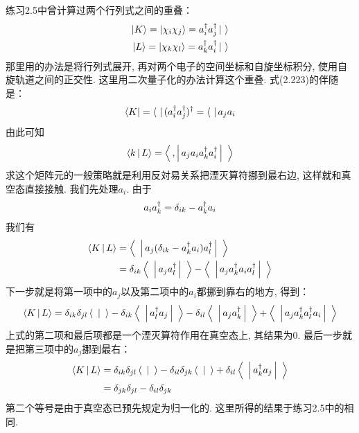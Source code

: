 练习2.5中曾计算过两个行列式之间的重叠：
\begin{align}
\Ket{K} = \Ket{\chi_i\chi_j} = a^\dagger_ia^\dagger_j\Ket{\,\,}\\
\Ket{L} = \Ket{\chi_k\chi_l} = a^\dagger_ka^\dagger_i\Ket{\,\,}
\end{align}
那里用的办法是将行列式展开, 再对两个电子的空间坐标和自旋坐标积分, 使用自旋轨道之间的正交性. 这里用二次量子化的办法计算这个重叠. 式(2.223)的伴随是：
\begin{align}
\Bra{K} = \Bra{\,\,}(a^\dagger_ia^\dagger_j)^\dagger = \Bra{\,\,}a_ja_i
\end{align}
由此可知
\begin{align}
\Braket{k|L} = \Braket{\,,|a_ja_ia^\dagger_ka^\dagger_i|\,\,}
\end{align}
求这个矩阵元的一般策略就是利用反対易关系把湮灭算符挪到最右边, 这样就和真空态直接接触. 我们先处理$a_i$. 由于
\begin{align}
a_ia^\dagger_k = \delta_{ik} - a^\dagger_ka_i
\end{align}
我们有
\begin{align}
\Braket{K|L} & = \Braket{\,\,|a_j(\delta_{ik}-a^\dagger_ka_i)a^\dagger_l|\,\,}\\
             & = \delta_{ik}\Braket{\,\,|a_ja^\dagger_l|\,\,} - \Braket{\,\,|a_ja^\dagger_ka_ia^\dagger_l|\,\,}
\end{align}
下一步就是将第一项中的$a_j$以及第二项中的$a_i$都挪到靠右的地方, 得到：
\begin{align}
\Braket{K|L} = \delta_{ik}\delta_{jl} \Braket{\,\,|\,\,} - \delta_{ik}\Braket{\,\,|a^\dagger_la_j|\,\,} - \delta_{il}\Braket{\,\,|a_ja^\dagger_k|\,\,} + \Braket{\,\,|a_ja^\dagger_ka^\dagger_la_i|\,\,}
\end{align}
上式的第二项和最后项都是一个湮灭算符作用在真空态上, 其结果为$0$. 最后一步就是把第三项中的$a_j$挪到最右：
\begin{align}
\Braket{K|L} & = \delta_{ik}\delta_{jl} \Braket{\,\,|\,\,} - \delta_{il}\delta_{jk}\Braket{\,\,|\,\,} + \delta_{il}\Braket{\,\,|a^\dagger_ka_j|\,\,}\notag\\
& = \delta_{jk}\delta_{jl} - \delta_{il}\delta_{jk}
\end{align}
第二个等号是由于真空态已预先规定为归一化的. 这里所得的结果于练习2.5中的相同. 
